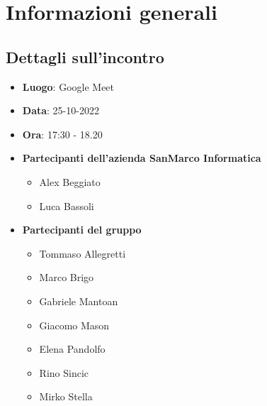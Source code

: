 \section{Informazioni generali}

\subsection{Dettagli sull'incontro}
\begin{itemize}
    \item \textbf{Luogo}: Google Meet
    \item \textbf{Data}: 25-10-2022
    \item \textbf{Ora}: 17:30 - 18.20
    \item \textbf{Partecipanti dell'azienda SanMarco Informatica}
        \begin{itemize}
            \item Alex Beggiato
            \item Luca Bassoli
        \end{itemize}
    \item \textbf{Partecipanti del gruppo}
        \begin{itemize}
            \item Tommaso Allegretti
            \item Marco Brigo
            \item Gabriele Mantoan
            \item Giacomo Mason
            \item Elena Pandolfo
            \item Rino Sincic
            \item Mirko Stella
        \end{itemize}
\end{itemize}

